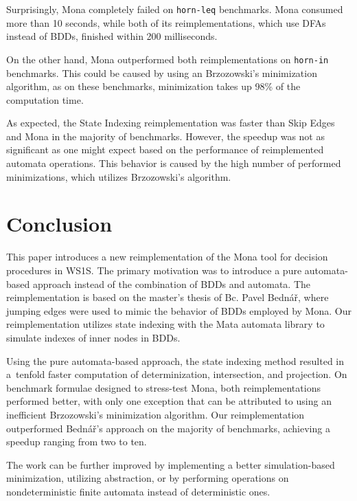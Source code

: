 \documentclass[pdflatex,sn-mathphys-num]{sn-jnl}%
\theoremstyle{thmstyleone}%
\theoremstyle{thmstyletwo}%
\theoremstyle{thmstylethree}%
\begin{document}
        Surprisingly, Mona completely failed on \texttt{horn-leq} benchmarks. Mona consumed more than 10 seconds, while both of its reimplementations, which use DFAs instead of BDDs, finished within 200 milliseconds.

        On the other hand, Mona outperformed both reimplementations on \texttt{horn-in} benchmarks. This could be caused by using an Brzozowski's minimization algorithm, as on these benchmarks, minimization takes up 98\% of the computation time.

        As expected, the State Indexing reimplementation was faster than Skip Edges and Mona in the majority of benchmarks. However, the speedup was not as significant as one might expect based on the performance of reimplemented automata operations. This behavior is caused by the high number of performed minimizations, which utilizes Brzozowski's algorithm.

\section{Conclusion}
    This paper introduces a new reimplementation of the Mona tool for decision procedures in WS1S. The primary motivation was to introduce a pure automata-based approach instead of the combination of BDDs and automata. The reimplementation is based on the master's thesis of Bc. Pavel Bednář, where jumping edges were used to mimic the behavior of BDDs employed by Mona. Our reimplementation utilizes state indexing with the Mata automata library to simulate indexes of inner nodes in BDDs.

    Using the pure automata-based approach, the state indexing method resulted in a~tenfold faster computation of determinization, intersection, and projection. On benchmark formulae designed to stress-test Mona, both reimplementations performed better, with only one exception that can be attributed to using an inefficient Brzozowski's minimization algorithm. Our reimplementation outperformed Bednář's approach on the majority of benchmarks, achieving a speedup ranging from two to ten.

    The work can be further improved by implementing a better simulation-based minimization, utilizing abstraction, or by performing operations on nondeterministic finite automata instead of deterministic ones.

    \vspace*{6em}

\end{document}
